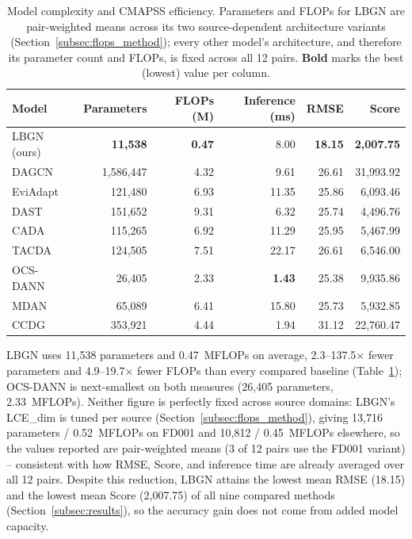 \begin{table}[t]
\centering
\caption{Model complexity and CMAPSS efficiency. Parameters and FLOPs for
LBGN are pair-weighted means across its two source-dependent architecture
variants (Section~\ref{subsec:flops_method}); every other model's
architecture, and therefore its parameter count and FLOPs, is fixed across
all 12 pairs. \textbf{Bold} marks the best (lowest) value per column.}
\label{tab:complexity}
\begin{tabular}{lrrrrr}
\toprule
Model & Parameters & FLOPs (M) & Inference (ms) & RMSE & Score \\
\midrule
LBGN (ours)              & \textbf{11{,}538}    & \textbf{0.47} & 8.00           & \textbf{18.15} & \textbf{2{,}007.75} \\
DAGCN~\cite{li2021DAGCN}       & 1{,}586{,}447   & 4.32          & 9.61           & 26.61          & 31{,}993.92 \\
EviAdapt~\cite{hou2025EviAdapt} & 121{,}480       & 6.93          & 11.35          & 25.86          & 6{,}093.46 \\
DAST~\cite{li2022DAST}         & 151{,}652       & 9.31          & 6.32           & 25.74          & 4{,}496.76 \\
CADA~\cite{ragab2021CADA}      & 115{,}265       & 6.92          & 11.29          & 25.95          & 5{,}467.99 \\
TACDA~\cite{hou2025TACDA}      & 124{,}505       & 7.51          & 22.17          & 26.61          & 6{,}546.00 \\
OCS-DANN~\cite{nejjar2023OCSDANN} & 26{,}405     & 2.33          & \textbf{1.43}  & 25.38          & 9{,}935.86 \\
MDAN~\cite{furqon2024MDAN}     & 65{,}089        & 6.41          & 15.80          & 25.73          & 5{,}932.85 \\
CCDG~\cite{mohamed2022CCDG}    & 353{,}921       & 4.44          & 1.94           & 31.12          & 22{,}760.47 \\
\bottomrule
\end{tabular}
\end{table}

LBGN uses 11{,}538 parameters and 0.47~MFLOPs on average, 2.3--137.5$\times$
fewer parameters and 4.9--19.7$\times$ fewer FLOPs than every compared
baseline (Table~\ref{tab:complexity}); OCS-DANN is next-smallest on both
measures (26{,}405 parameters, 2.33~MFLOPs). Neither figure is perfectly
fixed across source domains: LBGN's LCE\_dim is tuned per source
(Section~\ref{subsec:flops_method}), giving 13{,}716 parameters / 0.52~MFLOPs
on FD001 and 10{,}812 / 0.45~MFLOPs elsewhere, so the values reported are
pair-weighted means (3 of 12 pairs use the FD001 variant) -- consistent with
how RMSE, Score, and inference time are already averaged over all 12 pairs.
Despite this reduction, LBGN attains the lowest mean RMSE (18.15) and the
lowest mean Score (2{,}007.75) of all nine compared methods
(Section~\ref{subsec:results}), so the accuracy gain does not come from
added model capacity.

